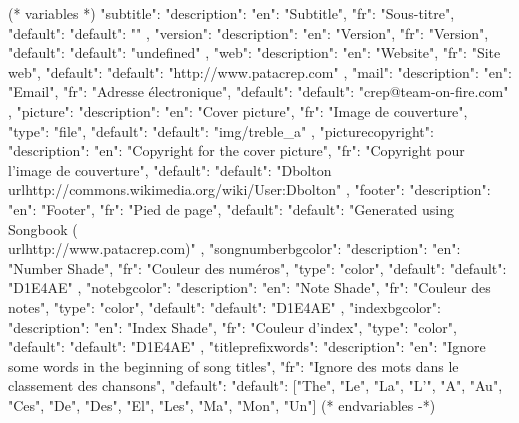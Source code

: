 
(* variables *)
{
"subtitle": {"description": {"en": "Subtitle", "fr": "Sous-titre"},
            "default": {"default": ""}
            },
"version":{ "description": {"en": "Version", "fr": "Version"},
            "default": {"default": "undefined"}
         },
"web": {"description": {"en": "Website", "fr": "Site web"},
         "default": {"default": "http://www.patacrep.com"}
      },
"mail": {"description": {"en": "Email", "fr": "Adresse électronique"},
         "default": {"default": "crep@team-on-fire.com"}
      },
"picture": {"description": {"en": "Cover picture", "fr": "Image de couverture"},
            "type": "file",
            "default": {"default": "img/treble_a"}
         },
"picturecopyright": {"description": {"en": "Copyright for the cover picture", "fr": "Copyright pour l'image de couverture"},
                     "default": {"default": "Dbolton \\url{http://commons.wikimedia.org/wiki/User:Dbolton}"}
                  },
"footer": {"description": {"en": "Footer", "fr": "Pied de page"},
           "default": {"default": "Generated using Songbook (\\url{http://www.patacrep.com})"}
        },
"songnumberbgcolor": {"description": {"en": "Number Shade", "fr": "Couleur des numéros"},
                     "type": "color",
                     "default": {"default": "D1E4AE"}
                  },
"notebgcolor": {"description": {"en": "Note Shade", "fr": "Couleur des notes"},
               "type": "color",
               "default": {"default": "D1E4AE"}
            },
"indexbgcolor": {"description": {"en": "Index Shade", "fr": "Couleur d'index"},
               "type": "color",
               "default": {"default": "D1E4AE"}
            },
"titleprefixwords": {"description": {"en": "Ignore some words in the beginning of song titles",
                                     "fr": "Ignore des mots dans le classement des chansons"},
                     "default": {"default": ["The", "Le", "La", "L'", "A", "Au", "Ces", "De",
                     						 "Des", "El", "Les", "Ma", "Mon", "Un"]}
                     }
}
(* endvariables -*)

